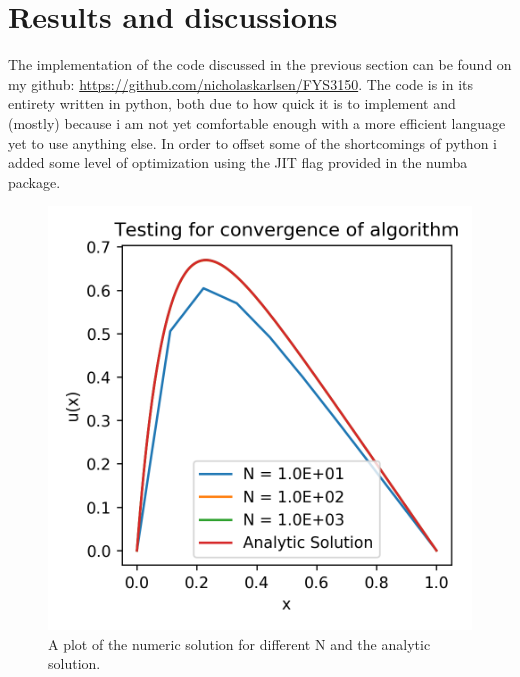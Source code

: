 \documentclass[10pt,showpacs,preprintnumbers,footinbib,amsmath,amssymb,aps,prl,twocolumn,groupedaddress,superscriptaddress,showkeys]{revtex4-1}
\begin{document}
\section{Results and discussions}
  The implementation of the code discussed in the previous section can be found on my github: \url{https://github.com/nicholaskarlsen/FYS3150}. The code is in its entirety written in python, both due to how quick it is to implement and (mostly) because i am not yet comfortable enough with a more efficient language yet to use anything else. In order to offset some of the shortcomings of python i added some level of optimization using the JIT flag provided in the numba package.


  \begin{figure}[h!]
    \center
    \includegraphics[scale=.7]{figs/ex1c_compare.png}
    \caption{A plot of the numeric solution for different N and the analytic solution.}
    \label{fig:compare}
  \end{figure}
\end{document}
